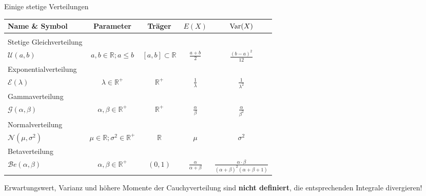 \documentclass[
  10pt,
  ignorenonframetext,
]{beamer}
\begin{document}
\begin{frame}{Einige stetige Verteilungen}
\protect\hypertarget{einige-stetige-verteilungen}{}
\begin{center}
\begin{tabular}{l|c c c c}
Name \& Symbol
& Parameter
& Träger
& $E(X)$
& $\operatorname{Var}(X)$ \\
\hline
\\
Stetige Gleichverteilung\\
$ \mathcal{U}(a, b)$
& $a, b  \in \mathbb R; a \leq b$
& $[a, b] \subset \mathbb R$
& $\frac{a + b}{2}$
& $\frac{(b - a)^2}{12}$\\[1.5em]

Exponentialverteilung\\
$ \mathcal{E}(\lambda) $
& $\lambda \in \mathbb R^+$
& $\mathbb R^+$
& $\frac{1}{\lambda}$
& $\frac{1}{\lambda^2}$\\[1.5em]

Gammaverteilung\\
$\mathcal{G}(\alpha, \beta)$
& $\alpha, \beta \in \mathbb R^+$
& $\mathbb R^+$
& $\frac{\alpha}{\beta}$
& $\frac{\alpha}{\beta^2}$\\[1.5em]

Normalverteilung\\
$ \mathcal{N}(\mu, \sigma^2)$
& $\mu \in \mathbb R; \sigma^2 \in \mathbb R^+$
& $\mathbb R $
& $\mu$
& $\sigma^2$\\[1.5em]

Betaverteilung\\
$ {\mathcal Be}(\alpha, \beta)$
& $\alpha, \beta \in \mathbb R^+$
& $(0, 1)$
& $\frac{\alpha}{\alpha + \beta}$
& $\frac{\alpha \cdot \beta}
{(\alpha+\beta)^2 (\alpha+\beta+1)}$
\end{tabular}
\end{center}

Erwartungswert, Varianz und höhere Momente der Cauchyverteilung sind
\textbf{nicht definiert}, die entsprechenden Integrale divergieren!
\end{frame}
\end{document}
